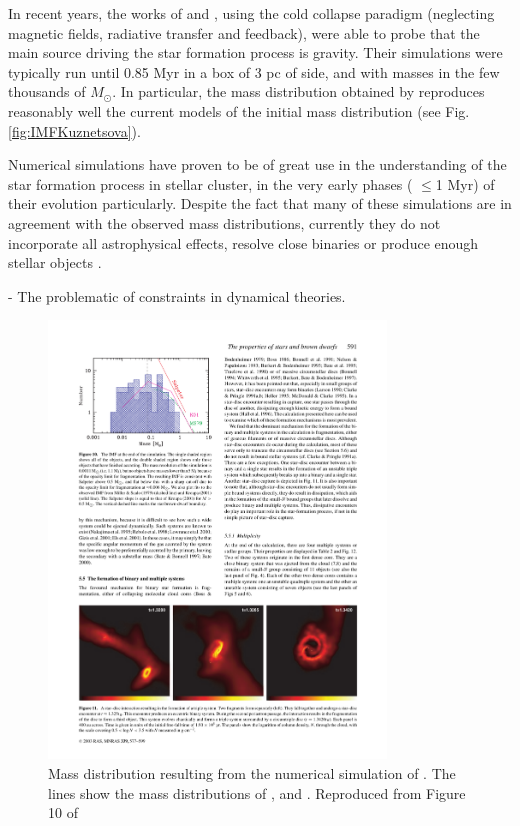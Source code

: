 In recent years, the works of \citet{2015ApJ...815...27K} and \citet{2015MNRAS.452..566B}, using the cold collapse paradigm (neglecting magnetic fields, radiative transfer and feedback), were able to probe that the main source driving the star formation process is gravity. Their simulations were typically run until 0.85 Myr in a box of 3 pc of side, and with masses in the few thousands of $M_{\odot}$. In particular, the mass distribution obtained by \citet{2015ApJ...815...27K} reproduces reasonably well the current models of the initial mass distribution (see Fig. \ref{fig:IMFKuznetsova}).


Numerical simulations have proven to be of great use in the understanding of the star formation process in stellar cluster, in the very early phases ( $\leq$1 Myr) of their evolution particularly.  Despite the fact that many of these simulations are in agreement with the observed mass distributions, currently they do not incorporate all astrophysical effects, resolve close binaries or produce enough stellar objects \citep{Offner2014}. 

- The problematic of constraints in dynamical theories.

\begin{figure}[htbp]
\begin{center}
\includegraphics[width=0.8\textwidth]{background/Figures/F10_Bate2003.pdf}
\caption{Mass distribution resulting from the numerical simulation of \citet{2003MNRAS.339..577B}. The lines show the mass distributions of \citet{Salpeter1955}, \citet{Miller1979} and \citet{Kroupa2001}. Reproduced from Figure 10 of \citet{2003MNRAS.339..577B}}
\label{fig:IMFBate2003}
\end{center}
\end{figure}

